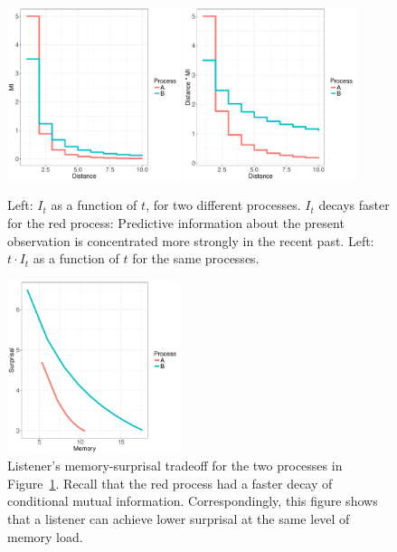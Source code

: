 \begin{figure}
\includegraphics[width=0.45\textwidth]{figures/decay.pdf}
\includegraphics[width=0.45\textwidth]{figures/memory.pdf}
%
	\caption{Left: $I_t$ as a function of $t$, for two different processes. $I_t$ decays faster for the red process: Predictive information about the present observation is concentrated more strongly in the recent past. Left: $t \cdot I_t$ as a function of $t$ for the same processes. }\label{fig:basic}
\end{figure}

\begin{figure}
\includegraphics[width=0.45\textwidth]{figures/listener-tradeoff.pdf}
	\caption{Listener's memory-surprisal tradeoff for the two processes in Figure~\ref{fig:basic}. Recall that the red process had a faster decay of conditional mutual information. Correspondingly, this figure shows that a listener can achieve lower surprisal at the same level of memory load.}\label{fig:listener-tradeoff}
\end{figure}






